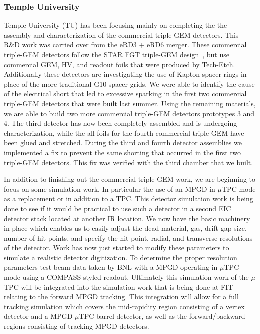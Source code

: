 \subsubsection{Temple University} 
Temple University (TU) has been focusing mainly on completing the the assembly and characterization of the commercial triple-GEM detectors. This R\&D work was carried over from the eRD3 + eRD6 merger. These commercial triple-GEM detectors follow the STAR FGT triple-GEM design~\cite{STARfgt}, but use commercial GEM, HV, and readout foils that were produced by Tech-Etch. Additionally these detectors are investigating the use of Kapton spacer rings in place of the more traditional G10 spacer grids. We were able to identify the cause of the electrical short that led to excessive sparking in the first two commercial triple-GEM detectors that were built last summer. Using the remaining materials, we are able to build two more commercial triple-GEM detectors prototypes 3 and 4. The third detector has now been completely assembled and is undergoing characterization, while the all foils for the fourth commercial triple-GEM have been glued and stretched. During the third and fourth detector assemblies we implemented a fix to prevent the same shorting that occurred in the first two triple-GEM detectors. This fix was verified with the third chamber that we built.

In addition to finishing out the commercial triple-GEM work, we are beginning to focus on some simulation work. In particular the use of an MPGD in $\mu$TPC mode as a replacement or in addition to a TPC. This detector simulation work is being done to see if it would be practical to use such a detector in a second EIC detector stack located at another IR location. We now have the basic machinery in place which enables us to easily adjust the dead material, gas, drift gap size, number of hit points, and specify the hit point, radial, and transverse resolutions of the detector. Work has now just started to modify these parameters to simulate a realistic detector digitization. To determine the proper resolution parameters test beam data taken by BNL with a MPGD operating in $\mu$TPC mode using a COMPASS styled readout. Ultimately this simulation work of the $\mu$TPC will be integrated into the simulation work that is being done at FIT relating to the forward MPGD tracking. This integration will allow for a full tracking simulation which covers the mid-rapidity region consisting of a vertex detector and a MPGD $\mu$TPC barrel detector, as well as the forward/backward regions consisting of tracking MPGD detectors.